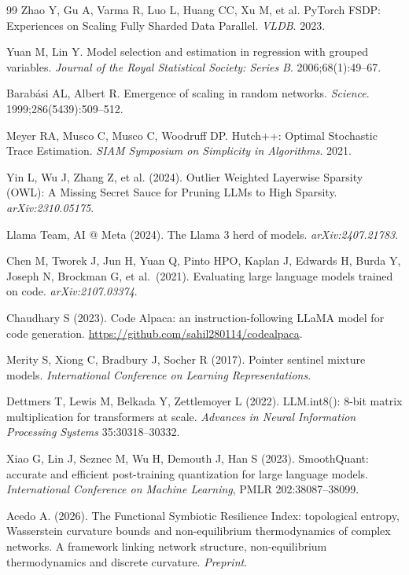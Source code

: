 \documentclass[11pt,a4paper]{article}
\begin{document}
\begin{thebibliography}{99}
Zhao Y, Gu A, Varma R, Luo L, Huang CC, Xu M, et al.
PyTorch FSDP: Experiences on Scaling Fully Sharded Data Parallel.
\textit{VLDB}. 2023.

Yuan M, Lin Y.
Model selection and estimation in regression with grouped variables.
\textit{Journal of the Royal Statistical Society: Series B}.
2006;68(1):49--67.

Barab\'asi AL, Albert R.
Emergence of scaling in random networks.
\textit{Science}. 1999;286(5439):509--512.

Meyer RA, Musco C, Musco C, Woodruff DP.
Hutch++: Optimal Stochastic Trace Estimation.
\textit{SIAM Symposium on Simplicity in Algorithms}. 2021.

Yin L, Wu J, Zhang Z, et al. (2024).
Outlier Weighted Layerwise Sparsity (OWL): A Missing Secret Sauce for
Pruning LLMs to High Sparsity.
\textit{arXiv:2310.05175}.

Llama Team, AI @ Meta (2024).
The Llama 3 herd of models.
\emph{arXiv:2407.21783}.

Chen M, Tworek J, Jun H, Yuan Q, Pinto HPO, Kaplan J, Edwards H, Burda Y,
Joseph N, Brockman G, et al.\ (2021).
Evaluating large language models trained on code.
\emph{arXiv:2107.03374}.

Chaudhary S (2023).
Code Alpaca: an instruction-following LLaMA model for code generation.
\url{https://github.com/sahil280114/codealpaca}.

Merity S, Xiong C, Bradbury J, Socher R (2017).
Pointer sentinel mixture models.
\emph{International Conference on Learning Representations}.

Dettmers T, Lewis M, Belkada Y, Zettlemoyer L (2022).
LLM.int8(): 8-bit matrix multiplication for transformers at scale.
\emph{Advances in Neural Information Processing Systems} 35:30318--30332.

Xiao G, Lin J, Seznec M, Wu H, Demouth J, Han S (2023).
SmoothQuant: accurate and efficient post-training quantization for large
language models.
\emph{International Conference on Machine Learning}, PMLR 202:38087--38099.

Acedo A. (2026).
The Functional Symbiotic Resilience Index: topological entropy, Wasserstein
curvature bounds and non-equilibrium thermodynamics of complex networks. A
framework linking
network structure, non-equilibrium thermodynamics and discrete curvature.
\emph{Preprint}.


\end{thebibliography}
\end{document}
